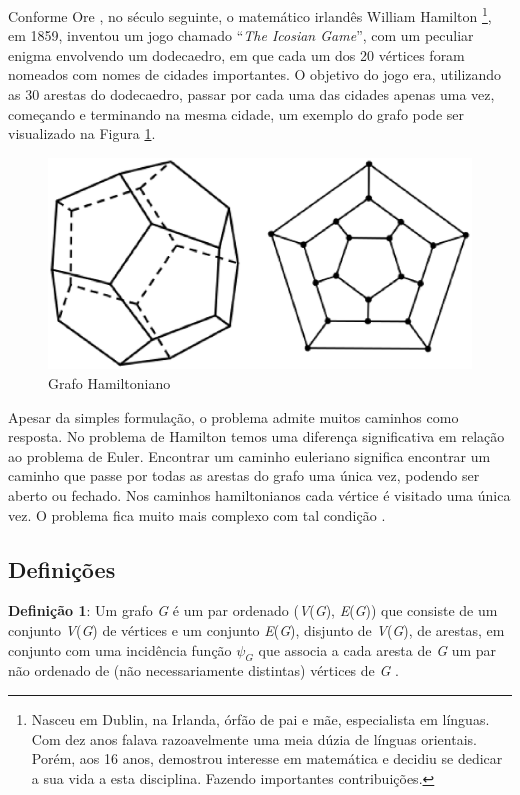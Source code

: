 Conforme Ore \cite{Ore:1963}, no século seguinte, o matemático irlandês William Hamilton \footnote{Nasceu em Dublin, na Irlanda, órfão de pai e mãe, especialista em línguas. Com dez anos falava razoavelmente uma meia dúzia de línguas orientais. Porém, aos 16 anos, demostrou interesse em matemática e decidiu se dedicar a sua vida a esta disciplina. Fazendo importantes contribuições.}, em 1859, inventou um jogo chamado ``\textit{The Icosian Game}'', com um peculiar enigma envolvendo um dodecaedro, em que cada um dos 20 vértices foram nomeados com nomes de cidades importantes. O objetivo do jogo era, utilizando as 30 arestas do dodecaedro, passar por cada uma das cidades apenas uma vez, começando e terminando na mesma cidade, um exemplo do grafo pode ser visualizado na Figura \ref{grafo_hamiltoniano}.

\begin{figure}[!h]
	\centering
	\includegraphics[scale=0.3]{figuras/capitulo2/grafo_hamiltoniano.eps}
	\caption{Grafo Hamiltoniano}
	\label{grafo_hamiltoniano}
\end{figure}

Apesar da simples formulação, o problema admite muitos caminhos como resposta. No problema de Hamilton temos uma diferença significativa em relação ao problema de Euler. Encontrar um caminho euleriano significa encontrar um caminho que passe por todas as arestas do grafo uma única vez, podendo ser aberto ou fechado. Nos caminhos hamiltonianos cada vértice é visitado uma única vez. O problema fica muito mais complexo com tal condição \cite{Costa:2011}.

\subsection{Definições}

\textbf{Definição 1}: Um grafo \textit{G} é um par ordenado (\textit{V}(\textit{G}), \textit{E}(\textit{G})) que consiste de um conjunto \textit{V}(\textit{G}) de vértices e um conjunto \textit{E}(\textit{G}), disjunto de \textit{V}(\textit{G}), de arestas, em conjunto com uma incidência função $\psi_G$ que associa a cada aresta de \textit{G} um par não ordenado de (não necessariamente distintas) vértices de \textit{G} \cite{Bondy:2007}.

